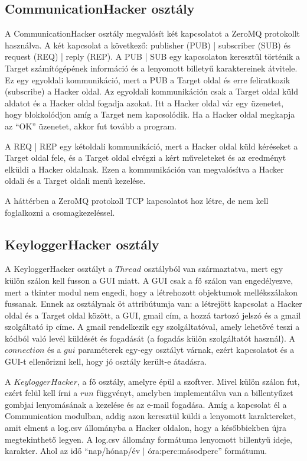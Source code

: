 \documentclass[12pt,a4paper,oneside]{report}
\begin{document}
\subsection{CommunicationHacker osztály}\label{subsubsec:serverclass}
A CommunicationHacker osztály megvalósít két kapcsolatot a ZeroMQ protokollt használva. A két kapcsolat a következő: publisher (PUB) | subscriber (SUB) és request (REQ) | reply (REP). A PUB | SUB egy kapcsolaton keresztül történik a Target számítógépének információ és a lenyomott billetyű karaktereinek átvitele. Ez egy egyoldali kommunikáció, mert a PUB a Target oldal és erre feliratkozik (subscribe) a Hacker oldal. Az egyoldali kommunikáción csak a Target oldal küld aldatot és a Hacker oldal fogadja azokat. Itt a Hacker oldal vár egy üzenetet, hogy blokkolódjon amíg a Target nem kapcsolódik. Ha a Hacker oldal megkapja az ``OK'' üzenetet, akkor fut tovább a program.

A REQ | REP egy kétoldali kommunikáció, mert a Hacker oldal küld kéréseket a Target oldal fele, és a Target oldal elvégzi a kért műveleteket és az eredményt elküldi a Hacker oldalnak. Ezen a kommunikáción van megvalósítva a Hacker oldali és a Target oldali menü kezelése.

A háttérben a ZeroMQ protokoll TCP kapcsolatot hoz létre, de nem kell foglalkozni a csomagkezeléssel.

\subsection{KeyloggerHacker osztály}\label{subsubsec:keyloggerclass}
A KeyloggerHacker osztályt a $Thread$ osztályból van származtatva, mert egy külön szálon kell fusson a GUI miatt. A GUI csak a fő szálon van engedélyezve, mert a tkinter modul nem engedi, hogy a létrehozott objektumok mellékszálakon fussanak. Ennek az osztálynak öt attribútumja van: a létrejött kapcsolat a Hacker oldal és a Target oldal között, a GUI, gmail cím, a hozzá tartozó jelszó és a gmail szolgáltató ip címe. A gmail rendelkezik egy szolgáltatóval, amely lehetővé teszi a kódból való levél küldését és fogadását (a fogadás külön szolgáltatót használ). A $connection$ és a $gui$ paraméterek egy-egy osztályt várnak, ezért kapcsolatot és a GUI-t ellenőrizni kell, hogy jó osztály került-e átadásra.

A $KeyloggerHacker$, a fő osztály, amelyre épül a szoftver. Mivel külön szálon fut, ezért felül kell írni a $run$ függvényt, amelyben implementálva van a billentyűzet gombjai lenyomásának a kezelése és az e-mail fogadása. Amíg a kapcsolat él a Communication modulban, addig azon keresztül küldi a lenyomott karaktereket, amit elment a log.csv állományba a Hacker oldalon, hogy a későbbiekben újra megtekinthető legyen. A log.csv állomány formátuma lenyomott billentyű ideje, karakter. Ahol az idő ``nap/hónap/év $|$ óra:perc:másodperc'' formátumu.
\end{document}
